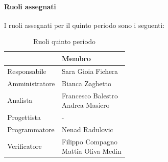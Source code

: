 \documentclass[a4paper,12pt]{article}
\begin{document}
            \paragraph{Ruoli assegnati}
            I ruoli assegnati per il quinto periodo sono i seguenti:
                \begin{table}[H]
                \centering
                \caption{Ruoli quinto periodo}
                \begin{tabular}{|l|l|}
                \hline
                    \rowcolor{lightgray}{\textbf{Ruolo}} & {\textbf{Membro}} \\
                \hline
                    Responsabile & Sara Gioia Fichera \\
                \hline
                    Amministratore & Bianca Zaghetto \\
                \hline
                    Analista & \makecell[l]{Francesco Balestro \\ Andrea Masiero} \\
                \hline
                    Progettista & - \\
                \hline
                    Programmatore & Nenad Radulovic \\
                \hline
                    Verificatore & \makecell[l]{Filippo Compagno \\ Mattia Oliva Medin} \\
                \hline
                \end{tabular}
                \end{table}
                
\end{document}

